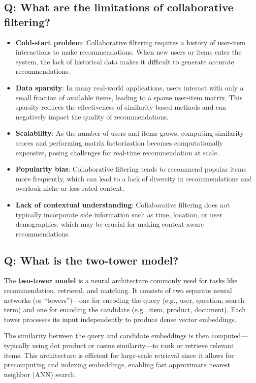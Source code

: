 \documentclass[11pt]{article}
\begin{document}
\subsection*{Q: What are the limitations of collaborative filtering?}
\begin{itemize}
	\item \textbf{Cold-start problem}: Collaborative filtering requires a history of user-item interactions to make recommendations. When new users or items enter the system, the lack of historical data makes it difficult to generate accurate recommendations.
	\item \textbf{Data sparsity}: In many real-world applications, users interact with only a small fraction of available items, leading to a sparse user-item matrix. This sparsity reduces the effectiveness of similarity-based methods and can negatively impact the quality of recommendations.
	\item \textbf{Scalability}: As the number of users and items grows, computing similarity scores and performing matrix factorization becomes computationally expensive, posing challenges for real-time recommendation at scale.
	\item \textbf{Popularity bias}: Collaborative filtering tends to recommend popular items more frequently, which can lead to a lack of diversity in recommendations and overlook niche or less-rated content.
	\item \textbf{Lack of contextual understanding}: Collaborative filtering does not typically incorporate side information such as time, location, or user demographics, which may be crucial for making context-aware recommendations.
\end{itemize}

\subsection*{Q: What is the two-tower model?}
The \textbf{two-tower model} is a neural architecture commonly used for tasks like recommendation, retrieval, and matching. It consists of two separate neural networks (or “towers”)—one for encoding the query (e.g., user, question, search term) and one for encoding the candidate (e.g., item, product, document). Each tower processes its input independently to produce dense vector embeddings.

The similarity between the query and candidate embeddings is then computed—typically using dot product or cosine similarity—to rank or retrieve relevant items. This architecture is efficient for large-scale retrieval since it allows for precomputing and indexing embeddings, enabling fast approximate nearest neighbor (ANN) search.
\end{document}
